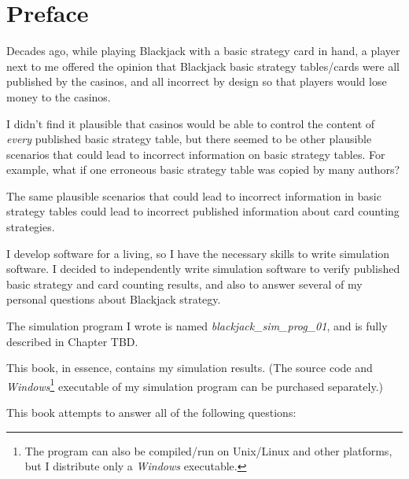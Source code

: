 \chapter{Preface}

Decades ago, while playing Blackjack with a basic strategy card
in hand, a player next to me offered the opinion that
Blackjack basic strategy tables/cards were all published by the casinos,
and all incorrect by design so that players would lose money to the
casinos.

I didn't find it plausible that casinos would be able to control
the content of \emph{every} published basic strategy table, but there
seemed to be other plausible scenarios that could lead to incorrect
information on
basic strategy tables.  For example, what if one erroneous basic
strategy table was copied by many authors?

The same plausible scenarios that could lead to incorrect information
in basic strategy tables could lead to incorrect published information about
card counting strategies.

I develop software for a living, so I have the necessary skills to write
simulation software.  I decided to independently write simulation software to verify
published basic strategy and card counting results, and also to answer
several of my personal questions about Blackjack strategy.

The simulation program I wrote is named \emph{blackjack\_sim\_prog\_01},
and is fully described in Chapter TBD.

This book, in essence, contains my simulation results.  (The source code
and \emph{Windows}\footnote{The program can also be compiled/run on Unix/Linux and
other platforms, but I distribute only a \emph{Windows} executable.}
executable of my simulation program can be purchased separately.)

This book attempts to answer all of the following questions:

